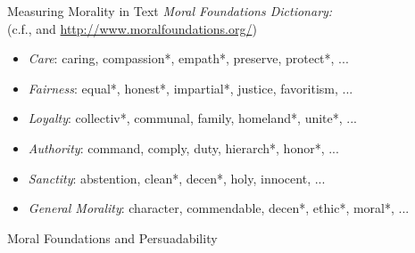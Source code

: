 \documentclass{beamer}
\begin{document}
\begin{frame}{Measuring Morality in Text}
\emph{Moral Foundations Dictionary:}\\
\footnotesize{(c.f., \citealt{graham2009liberals} and \url{http://www.moralfoundations.org/})}\\
\vspace{2em}
\begin{itemize}
	\item \emph{Care}: caring, compassion*, empath*, preserve, protect*, ...
	\item \emph{Fairness}: equal*, honest*, impartial*, justice, favoritism, ...
	\item \emph{Loyalty}: collectiv*, communal, family, homeland*, unite*, ...
	\item \emph{Authority}: command, comply, duty, hierarch*, honor*, ...
	\item \emph{Sanctity}: abstention, clean*, decen*, holy, innocent, ...
	\item \emph{General Morality}: character, commendable, decen*, ethic*, moral*, ...
\end{itemize}
\end{frame}

\begin{frame}{Moral Foundations and Persuadability}
\begin{figure}
\end{figure}
\end{frame}
\end{document}
